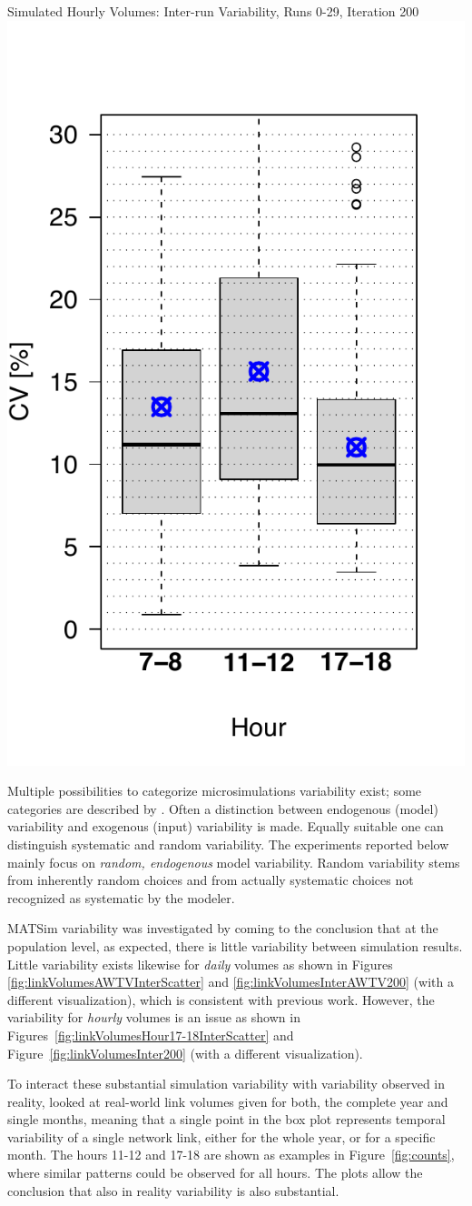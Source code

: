 {	{\label{fig:H1718}}%
  {}%
	\createsubfigure%
  {Simulated Hourly Volumes: Inter-run Variability, Runs 0-29, Iteration 200}%
	{\includegraphics[height=0.3\textwidth]{understanding/figures/var/linkVolumesInter200.pdf}}%
	{\label{fig:linkVolumesInter200}}%
  {}%
}%
{}

Multiple possibilities to categorize microsimulations variability exist; some categories are described by \citet[][]{HorniEtAl_TechRep_IVT_2011_b}. Often a distinction between endogenous (model) variability and exogenous (input) variability is made. Equally suitable one can distinguish systematic and random variability. The experiments reported below mainly focus on \emph{random, endogenous} model variability. Random variability stems from inherently random choices and from actually systematic choices not recognized as systematic by the modeler.

MATSim variability was investigated by \citet[][]{HorniEtAl_TechRep_IVT_2011_b, HorniEtAl_STRC_2011, Dayte_TechRep_IVT_2012} coming to the conclusion that at the population level, as expected, there is little variability between simulation results. Little variability exists likewise for \emph{daily} volumes as shown in Figures \ref{fig:linkVolumesAWTVInterScatter} and \ref{fig:linkVolumesInterAWTV200} (with a different visualization), which is consistent with previous work. However, the variability for \emph{hourly} volumes is an issue as shown in Figures~\ref{fig:linkVolumesHour17-18InterScatter} and Figure~\ref{fig:linkVolumesInter200} (with a different visualization).

To interact these substantial simulation variability with variability observed in reality, \citet[][]{HorniEtAl_STRC_2011} looked at real-world link volumes given for both, the complete year and single months, meaning that a single point in the box plot represents temporal variability of a single network link, either for the whole year, or for a specific month. The hours 11-12 and 17-18 are shown as examples in Figure~\ref{fig:counts}, where similar patterns could be observed for all hours. The plots allow the conclusion that also in reality variability is also substantial.

